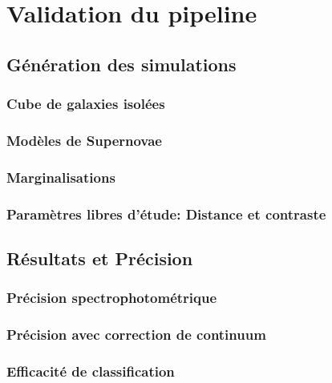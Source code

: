\documentclass[../main/main.tex]{subfiles}
\begin{document}
\setcounter{chapter}{7}
\chapter{Validation du pipeline
  \hypergal}\label{ch:simu}

\minitoc
\newpage

\section{Génération des simulations}

\subsection{Cube de galaxies isolées}

\subsection{Modèles de Supernovae}

\subsection{Marginalisations}

\subsection{Paramètres libres d'étude: Distance et contraste}

\section{Résultats et Précision}

\subsection{Précision spectrophotométrique}

\subsection{Précision avec correction de continuum}

\subsection{Efficacité de classification}
\end{document}
